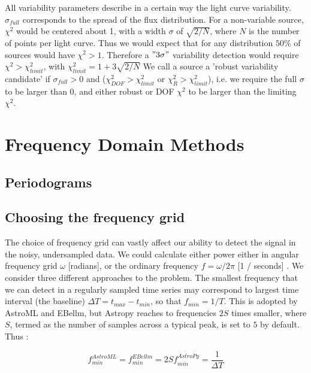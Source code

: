 \documentclass[fleqn,usenatbib]{mnras}  %
\begin{document}
All variability parameters describe in a certain way the light curve variability. $\sigma_{full}$  corresponds to the spread of the flux distribution. For a non-variable source, $\chi^{2}$ would be centered about 1, with a width $\sigma$ of $\sqrt{2/N}$, where $N$ is the number of points per light curve. Thus we would expect that for any distribution $50\%$ of sources would have $\chi^{2}>1$. Therefore a $"3\sigma"$ variability detection would require $\chi^{2} > \chi^{2}_{limit}$, with $\chi^{2}_{limit} = 1 + 3\sqrt{2/N}$
We call a source a 'robust variability candidate' if $\sigma_{full}>0$ and ($\chi^{2}_{DOF} > \chi^{2}_{limit}$ or $\chi^{2}_{R} > \chi^{2}_{limit}$), i.e. we require the full $\sigma$ to be larger than 0, and either robust or DOF $\chi^{2}$ to be larger than the limiting $\chi^{2}$. 





\section{Frequency Domain Methods}

\subsection{Periodograms}


\subsection{Choosing the frequency grid}
The choice of frequency grid can vastly affect our ability to detect the signal in the noisy, undersampled data. 
We could calculate either power either in angular frequency grid $\omega$ [radians], or the ordinary frequency $f = \omega / 2  \pi$ [1 / seconds] . 
We consider three different approaches to the problem.  
The smallest frequency that we can detect in a regularly sampled time series may correspond to largest time interval (the baseline) $\Delta T = t_{max} - t_{min}$, so that $f_{min} = 1 / T$. This is adopted by AstroML and EBellm, but Astropy reaches to frequencies $2 S$ times smaller, where $S$, termed as the number of samples across a typical peak, is set to $5$ by default. Thus :

\begin{equation}
f_{min}^{AstroML} = f_{min}^{EBellm} = 2 S f_{min}^{AstroPy} = \frac{1}{\Delta T}
\end{equation} 
\end{document}
